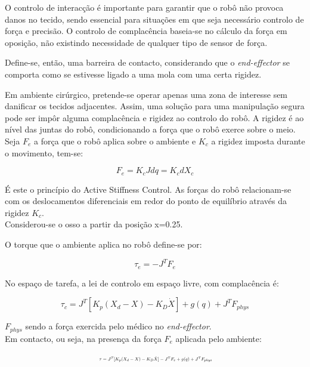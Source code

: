 \documentclass[a4paper,twocolumn,final,11pt]{article}
\begin{document}
O controlo de interacção é importante para garantir que o robô não provoca danos no tecido, sendo essencial para situações em que seja necessário controlo de força e precisão.
O controlo de complacência baseia-se no cálculo da força em oposição, não existindo necessidade de qualquer tipo de sensor de força. 

Define-se, então, uma barreira de contacto, considerando que o \textit{end-effector} se comporta como se estivesse ligado a uma mola com uma certa rigidez.

Em ambiente cirúrgico, pretende-se operar
apenas uma zona de interesse sem danificar os tecidos adjacentes. Assim, uma solução para uma manipulação segura pode ser impôr alguma complacência e rigidez ao controlo do robô.
A rigidez é ao nível das juntas do robô, condicionando a força que o robô exerce sobre o meio. 
Seja $F_e$ a força que o robô aplica sobre o ambiente e $K_c$ a rigidez imposta durante o movimento, tem-se:

\begin{equation}
    F_e = K_cJdq = K_cdX_c
\end{equation}

É este o princípio do Active Stiffness Control. As forças do robô relacionam-se com os deslocamentos diferenciais
em redor do ponto de equilíbrio através da rigidez $K_c$.
\\

Considerou-se o osso a partir da posição x=0.25. 
\linebreak

O torque que o ambiente aplica no robô define-se por:

\begin{equation}
    \tau_e=-J^{T}F_e
\end{equation}
\linebreak

No espaço de tarefa, a lei de controlo em espaço livre, com complacência é:

\begin{equation}
    \tau_c=J^{T}[K_p(X_d - X) - K_D\dot{X}] + g(q) + J^{T}F_{phys}
\end{equation}
\linebreak

$F_{phys}$ sendo a força exercida pelo médico no \textit{end-effector}.
\\

Em contacto, ou seja, na presença da força $F_e$ aplicada pelo ambiente:

\begin{equation}
\resizebox{.4\textwidth}{!}{
   $ \tau = J^{T}[K_p(X_d - X) - K_D\dot{X}] - J^{T}F_e + g(q) + J^{T}F_{phys}$}
\end{equation}
\linebreak
\end{document}
